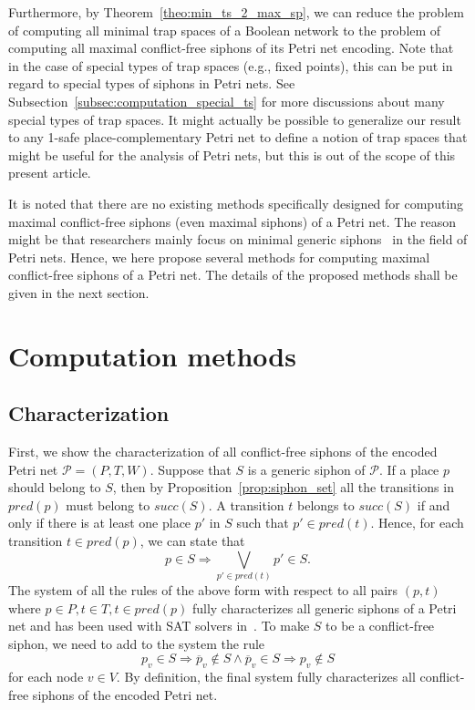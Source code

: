 \documentclass[preprint,12pt]{elsarticle}
\begin{document}
Furthermore, by Theorem~\ref{theo:min_ts_2_max_sp}, we can reduce the problem of computing all minimal trap spaces of a Boolean network to the problem of computing all maximal conflict-free siphons of its Petri net encoding.
Note that in the case of special types of trap spaces (e.g., fixed points), this can be put in regard to special types of siphons in Petri nets.
See Subsection~\ref{subsec:computation_special_ts} for more discussions about many special types of trap spaces.
It might actually be possible to generalize our result to any 1-safe place-complementary Petri net to define a notion of trap spaces that might be useful for the analysis of Petri nets, but this is out of the scope of this present article.

It is noted that there are no existing methods specifically designed for computing maximal conflict-free siphons (even maximal siphons) of a Petri net.
The reason might be that researchers mainly focus on minimal generic siphons~\cite{DBLP:journals/isci/LiuB16} in the field of Petri nets. 
Hence, we here propose several methods for computing maximal conflict-free siphons of a Petri net. 
The details of the proposed methods shall be given in the next section.

\section{Computation methods}
\label{sec:Computation}

\subsection{Characterization}
\label{subsec:siphon_characterization}

First, we show the characterization of all conflict-free siphons of the encoded Petri net \(\mathcal{P} = (P, T, W)\).
Suppose that \(S\) is a generic siphon of \(\mathcal{P}\). If a place \(p\) should belong to \(S\), then by Proposition~\ref{prop:siphon_set} all the transitions in \(pred(p)\) must belong to \(succ(S)\).
A transition \(t\) belongs to \(succ(S)\) if and only if there is at least one place \(p'\) in \(S\) such that \(p' \in pred(t)\).
Hence, for each transition \(t \in pred(p)\), we can state that
\begin{equation}
\label{eq:siphon}
p \in S \Rightarrow \bigvee_{p' \in pred(t)}p' \in S.
\end{equation}
The system of all the rules of the above form with respect to all pairs \((p, t)\) where \(p \in P, t \in T, t \in pred(p)\) fully characterizes all generic siphons of a Petri net and has been used with SAT solvers in~\cite{oanea2010new,nabli2016enumerating}.
To make \(S\) to be a conflict-free siphon, we need to add to the system the rule
\begin{equation}
\label{eq:conflict}
p_v \in S \Rightarrow \overline{p}_v \not \in S \wedge \overline{p}_v \in S \Rightarrow p_v \not \in S
\end{equation}for each node \(v \in V\).
By definition, the final system fully characterizes all conflict-free siphons of the encoded Petri net.
\end{document}
